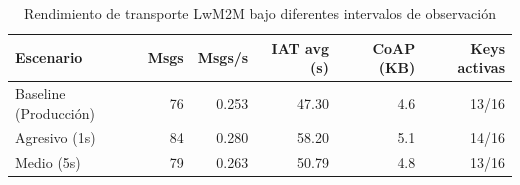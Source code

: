 
\begin{table}[htbp]
\centering
\caption{Rendimiento de transporte LwM2M bajo diferentes intervalos de observación}
\label{tab:lwm2m-benchmark}
\begin{tabular}{lrrrrr}
\toprule
\textbf{Escenario} & \textbf{Msgs} & \textbf{Msgs/s} & \textbf{IAT avg (s)} & \textbf{CoAP (KB)} & \textbf{Keys activas} \\
\midrule
Baseline (Producción) & 76 & 0.253 & 47.30 & 4.6 & 13/16 \\
Agresivo (1s) & 84 & 0.280 & 58.20 & 5.1 & 14/16 \\
Medio (5s) & 79 & 0.263 & 50.79 & 4.8 & 13/16 \\
\bottomrule
\end{tabular}
\end{table}
